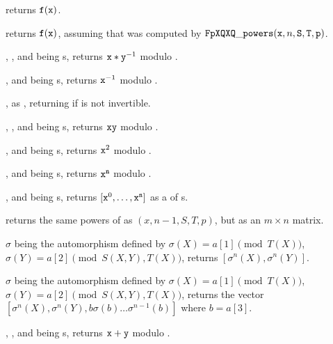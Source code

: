  returns
${\tt f}({\tt x})$.

 returns
${\tt f}({\tt x})$, assuming that  was computed by
${\tt FpXQXQ\_powers}({\tt x}, n, {\tt S}, {\tt T}, {\tt p})$.

, ,  and
 being s, returns ${\tt x}*{\tt y}^{-1}$ modulo .

,  and
 being s, returns ${\tt x}^{-1}$ modulo .

, as ,
returning  if  is not invertible.

, ,  and
 being s, returns $\kbd{x}\*\kbd{y}$ modulo .

,  and
 being s, returns ${\tt x}^2$ modulo .

,  and
 being s, returns ${\tt x}^{\tt n}$ modulo .

,  and
 being s, returns $[{\tt x}^0, \dots, {\tt x}^{\tt n}]$ as a
 of s.

returns the same powers of  as $(x, n-1,S, T, p)$,
but as an $m\times n$ matrix.

$\sigma$ being the automorphism defined by $\sigma(X)=a[1]\pmod{T(X)}$,
$\sigma(Y)=a[2]\pmod{S(X,Y),T(X)}$, returns $[\sigma^n(X),\sigma^n(Y)]$.

$\sigma$ being the automorphism defined by $\sigma(X)=a[1]\pmod{T(X)}$,
$\sigma(Y)=a[2]\pmod{S(X,Y),T(X)}$, returns the vector
$[\sigma^n(X),\sigma^n(Y),b\sigma(b)\ldots\sigma^{n-1}(b)]$
where $b=a[3]$.


, ,  and
 being s, returns ${\tt x} + {\tt y}$ modulo .


